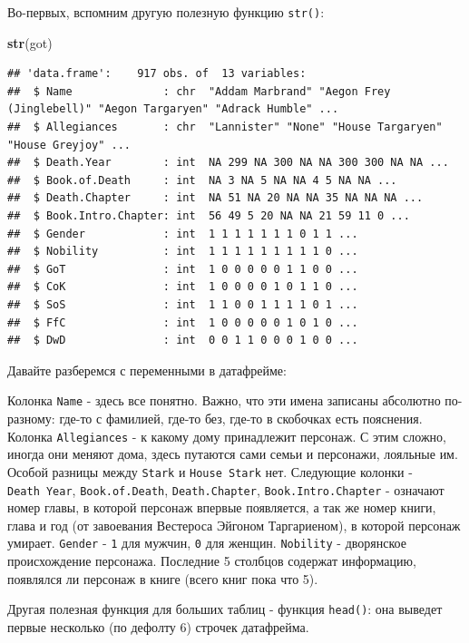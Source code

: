 \documentclass[]{book}
\newenvironment{Shaded}{\begin{snugshade}}{\end{snugshade}}
\newcommand{\KeywordTok}[1]{\textcolor[rgb]{0.13,0.29,0.53}{\textbf{#1}}}
\newcommand{\NormalTok}[1]{#1}
\begin{document}
Во-первых, вспомним другую полезную функцию \texttt{str()}:

\begin{Shaded}
\begin{Highlighting}[]
\KeywordTok{str}\NormalTok{(got)}
\end{Highlighting}
\end{Shaded}

\begin{verbatim}
## 'data.frame':    917 obs. of  13 variables:
##  $ Name              : chr  "Addam Marbrand" "Aegon Frey (Jinglebell)" "Aegon Targaryen" "Adrack Humble" ...
##  $ Allegiances       : chr  "Lannister" "None" "House Targaryen" "House Greyjoy" ...
##  $ Death.Year        : int  NA 299 NA 300 NA NA 300 300 NA NA ...
##  $ Book.of.Death     : int  NA 3 NA 5 NA NA 4 5 NA NA ...
##  $ Death.Chapter     : int  NA 51 NA 20 NA NA 35 NA NA NA ...
##  $ Book.Intro.Chapter: int  56 49 5 20 NA NA 21 59 11 0 ...
##  $ Gender            : int  1 1 1 1 1 1 1 0 1 1 ...
##  $ Nobility          : int  1 1 1 1 1 1 1 1 1 0 ...
##  $ GoT               : int  1 0 0 0 0 0 1 1 0 0 ...
##  $ CoK               : int  1 0 0 0 0 1 0 1 1 0 ...
##  $ SoS               : int  1 1 0 0 1 1 1 1 0 1 ...
##  $ FfC               : int  1 0 0 0 0 0 1 0 1 0 ...
##  $ DwD               : int  0 0 1 1 0 0 0 1 0 0 ...
\end{verbatim}

Давайте разберемся с переменными в датафрейме:

Колонка \texttt{Name} - здесь все понятно. Важно, что эти имена записаны
абсолютно по-разному: где-то с фамилией, где-то без, где-то в скобочках
есть пояснения. Колонка \texttt{Allegiances} - к какому дому принадлежит
персонаж. С этим сложно, иногда они меняют дома, здесь путаются сами
семьи и персонажи, лояльные им. Особой разницы между \texttt{Stark} и
\texttt{House\ Stark} нет. Следующие колонки - \texttt{Death\ Year},
\texttt{Book.of.Death}, \texttt{Death.Chapter},
\texttt{Book.Intro.Chapter} - означают номер главы, в которой персонаж
впервые появляется, а так же номер книги, глава и год (от завоевания
Вестероса Эйгоном Таргариеном), в которой персонаж умирает.
\texttt{Gender} - \texttt{1} для мужчин, \texttt{0} для женщин.
\texttt{Nobility} - дворянское происхождение персонажа. Последние 5
столбцов содержат информацию, появлялся ли персонаж в книге (всего книг
пока что 5).

Другая полезная функция для больших таблиц - функция \texttt{head()}:
она выведет первые несколько (по дефолту 6) строчек датафрейма.
\end{document}
